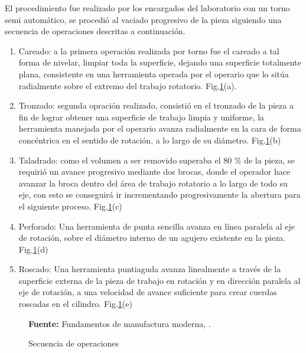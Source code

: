 El procedimiento fue realizado por los encargados del laboratorio con un torno semi autom\'atico, se procedi\'o al vaciado progresivo de la pieza siguiendo una secuencia de operaciones descritas a continuaci\'on.

\begin{enumerate}
\renewcommand{\theenumi}{\alph{enumi}} %
     \item Careado: a la primera operaci\'on realizada por torno fue el careado a tal forma de nivelar, limpiar toda la superficie, dejando una superficie totalmente plana, consistente en una herramienta operada por el operario que lo sit\'ua radialmente sobre el extremo del trabajo rotatorio. Fig.\ref{fig:torneado}(a).
    \item Tronzado: segunda opraci\'on realizado, consisti\'o en el tronzado de la pieza a fin de lograr obtener una superficie de trabajo limpia y uniforme, la herramienta manejada por el operario avanza radialmente en la cara de forma conc\'entrica en el sentido de rotaci\'on, a lo largo de su di\'ametro. Fig.\ref{fig:torneado}(b) 
    \item Taladrado: como el volumen  a ser removido superaba el 80 {\%} de la pieza, se requirió un avance progresivo mediante dos brocas, donde el operador hace avanzar la broca dentro del \'area de trabajo rotatorio a lo largo de todo su eje, con esto se conseguir\'a ir incrementando progresivamente la abertura para el siguiente proceso. Fig.\ref{fig:torneado}(c)
    \item Perforado: Una herramienta de punta sencilla avanza en línea paralela al eje de rotación, sobre el diámetro interno de un agujero existente en la pieza. Fig.\ref{fig:torneado}(d)
    \item Roscado: Una herramienta puntiaguda avanza linealmente a través de la superficie externa de la pieza de trabajo en rotación y en dirección paralela al eje de rotación, a una velocidad de avance suficiente para crear cuerdas roscadas en el cilindro. Fig.\ref{fig:torneado}(e)
\end{enumerate}

\begin{figure}[H]
\centering
{}
\caption{Secuencia de operaciones}{\textbf{Fuente:} Fundamentos de manufactura moderna, \cite{groover_fundamentos_1997}}.
\label{fig:torneado}
\end{figure}

